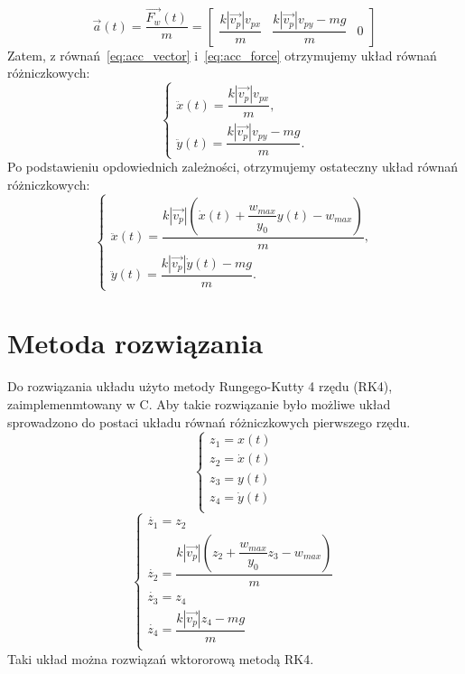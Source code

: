 \documentclass[12pt,a4paper]{article}
\begin{document}
\begin{equation}
    \vec{a}(t) = \frac{\vec{F_w}(t)}{m} =
    \begin{bmatrix}
        \dfrac{k |\vec{v_{p}}| v_{px}}{m}  & \dfrac{k|\vec{v_{p}}| v_{py} - mg}{m}  & 0
    \end{bmatrix}
    \label{eq:acc_force}
\end{equation}
Zatem, z równań~\eqref{eq:acc_vector} i~\eqref{eq:acc_force} otrzymujemy układ równań różniczkowych:
\begin{equation}
    \begin{cases}
        \ddot{x}(t) = \dfrac{k |\vec{v_{p}}| v_{px}}{m}, \\
        \ddot{y}(t) = \dfrac{k|\vec{v_{p}}| v_{py} - mg}{m}.
    \end{cases}
\end{equation}
Po podstawieniu opdowiednich zależności, otrzymujemy ostateczny układ równań różniczkowych:
\begin{equation}
    \begin{cases}
        \ddot{x}(t) = \dfrac{k |\vec{v_{p}}| (\dot{x}(t) + \dfrac{w_{max}}{y_0} y(t) - w_{max})}{m}, \\
        \ddot{y}(t) = \dfrac{k|\vec{v_{p}}| \dot{y}(t) - mg}{m}.
    \end{cases}
\end{equation}

\section{Metoda rozwiązania}
Do rozwiązania układu użyto metody Rungego-Kutty 4 rzędu (RK4), zaimplemenmtowany w C.
Aby takie rozwiązanie było możliwe układ sprowadzono do postaci układu równań różniczkowych pierwszego rzędu.
\begin{equation}
    \begin{cases}
        z_1 = x(t) \\
        z_2 = \dot{x}(t) \\
        z_3 = y(t) \\
        z_4 = \dot{y}(t) \\
    \end{cases}
\end{equation}
\begin{equation}
    \begin{cases}
        \dot{z_1} = z_2 \\
        \dot{z_2} = \dfrac{k |\vec{v_{p}}| (z_2 + \dfrac{w_{max}}{y_0} z_3 - w_{max})}{m} \\
        \dot{z_3} = z_4 \\
        \dot{z_4} = \dfrac{k|\vec{v_{p}}| z_4 - mg}{m} \\
    \end{cases}
\end{equation}
Taki układ można rozwiązań wktororową metodą RK4.
\end{document}

